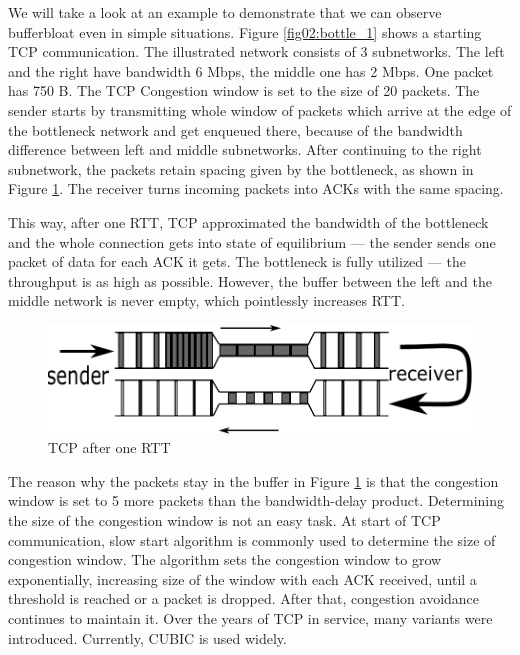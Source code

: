 We will take a look at an example to demonstrate that we can observe bufferbloat even in simple situations. Figure \ref{fig02:bottle_1} shows a starting TCP communication. The illustrated network consists of 3 subnetworks. The left and the right have bandwidth 6 Mbps, the middle one has 2 Mbps. One packet has 750 B. The TCP Congestion window is set to the size of 20 packets. The sender starts by transmitting whole window of packets which arrive at the edge of the bottleneck network and get enqueued there, because of the bandwidth difference between left and middle subnetworks. After continuing to the right subnetwork, the packets retain spacing given by the bottleneck, as shown in Figure \ref{fig03:bottle_2}. The receiver turns incoming packets into ACKs with the same spacing. 

This way, after one RTT, TCP approximated the bandwidth of the bottleneck and the whole connection gets into state of equilibrium --- the sender sends one packet of data for each ACK it gets. The bottleneck is fully utilized --- the throughput is as high as possible. However, the buffer between the left and the middle network is never empty, which pointlessly increases RTT.

\begin{figure}
	\centering
	\includegraphics[width=137mm]{drawings/tcp_bottleneck_2}
	\caption{TCP after one RTT}
	
	\label{fig03:bottle_2}
\end{figure}

The reason why the packets stay in the buffer in Figure \ref{fig03:bottle_2} is that the congestion window is set to 5 more packets than the bandwidth-delay product. Determining the size of the congestion window is not an easy task. At start of TCP communication, slow start algorithm \cite{Jacobson:1988:CAC:52324.52356} is commonly used to determine the size of congestion window. The algorithm sets the congestion window to grow exponentially, increasing size of the window with each ACK received, until a threshold is reached or a packet is dropped. After that, congestion avoidance continues to maintain it. Over the years of TCP in service, many variants were introduced. Currently, CUBIC \cite{CUBIC} is used widely. 


